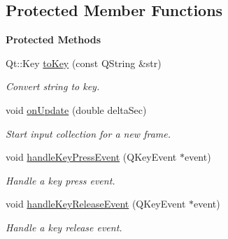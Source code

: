 \subsection*{Protected Member Functions}
\begin{Indent}\textbf{ Protected Methods}\par
\begin{DoxyCompactItemize}
\item 
\mbox{\label{classrev_1_1_key_handler_afb58b5da704e085fa8ca362dbac14a6e}} 
Qt\+::\+Key \mbox{\hyperlink{classrev_1_1_key_handler_afb58b5da704e085fa8ca362dbac14a6e}{to\+Key}} (const Q\+String \&str)
\begin{DoxyCompactList}\small\item\em Convert string to key. \end{DoxyCompactList}\item 
\mbox{\label{classrev_1_1_key_handler_ad9f8bc273dac3ffa6e6b05f7743aef90}} 
void \mbox{\hyperlink{classrev_1_1_key_handler_ad9f8bc273dac3ffa6e6b05f7743aef90}{on\+Update}} (double delta\+Sec)
\begin{DoxyCompactList}\small\item\em Start input collection for a new frame. \end{DoxyCompactList}\item 
\mbox{\label{classrev_1_1_key_handler_abcfebbe134f7056633f1c79e844f8726}} 
void \mbox{\hyperlink{classrev_1_1_key_handler_abcfebbe134f7056633f1c79e844f8726}{handle\+Key\+Press\+Event}} (Q\+Key\+Event $\ast$event)
\begin{DoxyCompactList}\small\item\em Handle a key press event. \end{DoxyCompactList}\item 
\mbox{\label{classrev_1_1_key_handler_a74a2dcfbfbd4c6a29cbf23bda7d51cd5}} 
void \mbox{\hyperlink{classrev_1_1_key_handler_a74a2dcfbfbd4c6a29cbf23bda7d51cd5}{handle\+Key\+Release\+Event}} (Q\+Key\+Event $\ast$event)
\begin{DoxyCompactList}\small\item\em Handle a key release event. \end{DoxyCompactList}\item 
\mbox{\label{classrev_1_1_key_handler_a04a9bdf70075dd1d3161d53d64f9996d}} 

\end{DoxyCompactItemize}
\end{Indent}
